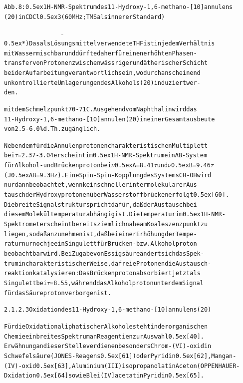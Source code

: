 \documentclass[a4paper,11pt]{article}
\begin{document}
\begin{alltt}
Abb. 8: \raise0.5ex\hbox{1}H-NMR-Spektrum des 11-Hydroxy-1,6-methano-[10]annulens
(20) in CDCl\lower0.5ex\hbox{3} (60 MHz; TMS als innerer Standard)

\(\overline{\hspace{7cm}}\)
\leavevmode\raise0.5ex\hbox{*}) Das als Lösungsmittel verwendete THF ist in jedem Verhältnis
   mit Wasser mischbar und dürfte daher für einen erhöhten Phasen-
   transfer von Protonen zwischen wässriger und ätherischer Schicht
   bei der Aufarbeitung verantwortlich sein, wodurch anscheinend
   unkontrollierte Umlagerungen des Alkohols (20) induziert wer-
   den.

\newpage
{}


mit dem Schmelzpunkt 70 - 71\degree{}C. Ausgehend vom Naphthalin wird das
11-Hydroxy-1,6-methano-[10]annulen (20) in einer Gesamtausbeute
von 2.5 - 6.0 \% d.Th. zugänglich.

Neben dem für die Annulenprotonen charakteristischen Multiplett
bei \(\tau\) = 2.37 - 3.04 erscheint im \raise0.5ex\hbox{1}H-NMR-Spektrum ein AB-System
für Alkohol- und Brückenproton bei \(\nu\)\lower0.5ex\hbox{A} = 8.41 \(\tau\) und \(\nu\)\lower0.5ex\hbox{B} = 9.46 \(\tau\)
(J\lower0.5ex\hbox{AB} = 9.3 Hz). Eine Spin-Spin-Kopplung des Systems CH-OH wird
nur dann beobachtet, wenn kein schneller intermolekularer Aus-
tausch der Hydroxyprotonen über Wasserstoffbrücken erfolgt \raise0.5ex\hbox{[60]}.
Die breite Signalstruktur spricht dafür, daß der Austausch bei
diesem Molekül temperaturabhängig ist. Die Temperatur im \raise0.5ex\hbox{1}H-NMR-
Spektrometer scheint bereits ziemlich nahe am Koaleszenzpunkt zu
liegen, so daß anzunehmen ist, daß bei einer Erhöhung der Tempe-
ratur nur noch je ein Singulett für Brücken- bzw. Alkoholproton
beobachtbar wird. Bei Zugabe von Essigsäure ändert sich das Spek-
trum in charakteristischer Weise, da freie Protonen die Austausch-
reaktion katalysieren: Das Brückenproton absorbiert jetzt als
Singulett bei \(\tau\) = 8.55, während das Alkoholproton unter dem Signal
für das Säureproton verborgen ist.

2.1.2.3 Oxidation des 11-Hydroxy-1,6-methano-[10]annulens (20)

Für die Oxidation aliphatischer Alkohole steht in der organischen
Chemie ein breites Spektrum an Reagentien zur Auswahl \raise0.5ex\hbox{[40]}.
Erwähnung an dieser Stelle verdienen besonders Chrom-(VI)-oxid in
Schwefelsäure (JONES-Reagens \raise0.5ex\hbox{[61]}) oder Pyridin \raise0.5ex\hbox{[62]}, Mangan-
(IV)-oxid \raise0.5ex\hbox{[63]}, Aluminium(III)isopropanolat in Aceton (OPPENHAUER-
Dxidation \raise0.5ex\hbox{[64]} sowie Blei(IV]acetat in Pyridin \raise0.5ex\hbox{[65]}.


\end{alltt}
\end{document}
